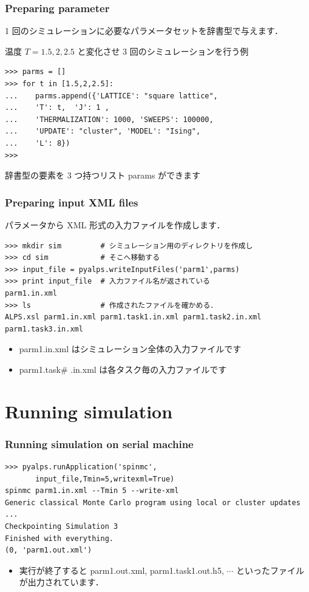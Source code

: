 \begin{frame}[t,fragile]
\frametitle{Preparing parameter}

1 回のシミュレーションに必要なパラメータセットを辞書型で与えます．


温度 $T = 1.5, 2, 2.5$ と変化させ 3 回のシミュレーションを行う例

\begin{lstlisting}
>>> parms = []
>>> for t in [1.5,2,2.5]:
...    parms.append({'LATTICE': "square lattice", 
...    'T': t,  'J': 1 ,
...    'THERMALIZATION': 1000, 'SWEEPS': 100000,
...    'UPDATE': "cluster", 'MODEL': "Ising",
...    'L': 8})
>>>
\end{lstlisting}

辞書型の要素を 3 つ持つリスト params ができます
\end{frame}

\begin{frame}[t,fragile]
\frametitle{Preparing input XML files}
パラメータから XML 形式の入力ファイルを作成します．
\begin{lstlisting}
>>> mkdir sim         # シミュレーション用のディレクトリを作成し
>>> cd sim            # そこへ移動する
>>> input_file = pyalps.writeInputFiles('parm1',parms)
>>> print input_file  # 入力ファイル名が返されている
parm1.in.xml
>>> ls                # 作成されたファイルを確かめる．
ALPS.xsl parm1.in.xml parm1.task1.in.xml parm1.task2.in.xml parm1.task3.in.xml
\end{lstlisting}
\begin{itemize}
 \item parm1.in.xml はシミュレーション全体の入力ファイルです
 \item parm1.task\# .in.xml は各タスク毎の入力ファイルです
\end{itemize}

\end{frame}

\section{Running simulation}
\begin{frame}[t,fragile]
\frametitle{Running simulation on serial machine}
\begin{lstlisting}
>>> pyalps.runApplication('spinmc',
       input_file,Tmin=5,writexml=True)
spinmc parm1.in.xml --Tmin 5 --write-xml
Generic classical Monte Carlo program using local or cluster updates
...
Checkpointing Simulation 3
Finished with everything.
(0, 'parm1.out.xml')
\end{lstlisting}
\begin{itemize}
\item 実行が終了すると parm1.out.xml, parm1.task1.out.h5, $\cdots$ といったファイルが出力されています．
\end{itemize}
 
\end{frame}

